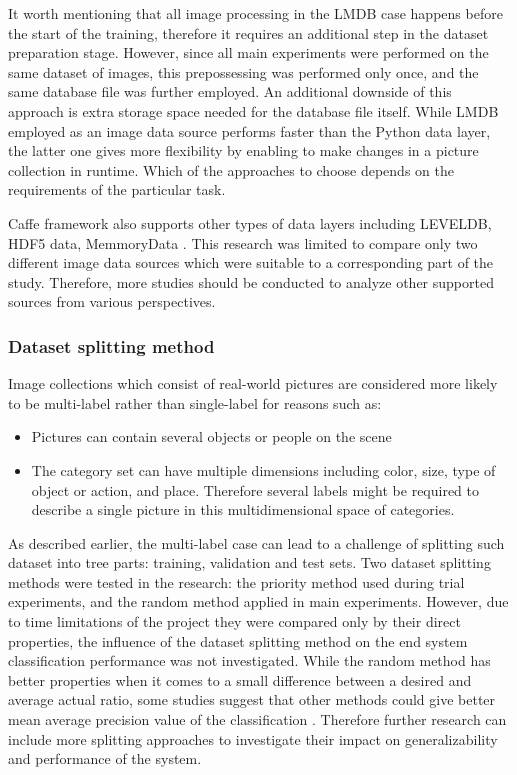 It worth mentioning that all image processing in the LMDB case happens before the start of the training, therefore it requires an additional step in the dataset preparation stage. However, since all main experiments were performed on the same dataset of images, this prepossessing was performed only once, and the same database file was further employed. An additional downside of this approach is extra storage space needed for the database file itself. While LMDB employed as an image data source performs faster than the Python data layer, the latter one gives more flexibility by enabling to make changes in a picture collection in runtime. Which of the approaches to choose depends on the requirements of the particular task.

Caffe framework also supports other types of data layers including LEVELDB, HDF5 data, MemmoryData \cite{CaffeLayerCatalogue}. This research was limited to compare only two different image data sources which were suitable to a corresponding part of the study. Therefore, more studies should be conducted to analyze other supported sources from various perspectives.

\subsubsection{Dataset splitting method}
Image collections which consist of real-world pictures are considered more likely to be multi-label rather than single-label for reasons such as:
\begin{itemize}
    \item Pictures can contain several objects or people on the scene
    \item The category set can have multiple dimensions including color, size, type of object or action, and place. Therefore several labels might be required to describe a single picture in this multidimensional space of categories.
\end{itemize}

As described earlier, the multi-label case can lead to a challenge of splitting such dataset into tree parts: training, validation and test sets. Two dataset splitting methods were tested in the research: the priority method used during trial experiments, and the random method applied in main experiments. However, due to time limitations of the project they were compared only by their direct properties, the influence of the dataset splitting method on the end system classification performance was not investigated. While the random method has better properties when it comes to a small difference between a desired and average actual ratio, some studies suggest that other methods could give better mean average precision value of the classification \cite{Sechidis2011OnData}. Therefore further research can include more splitting approaches to investigate their impact on generalizability and performance of the system.

